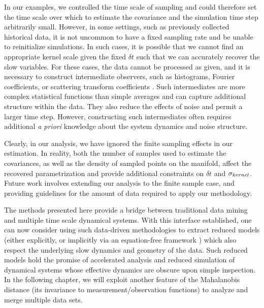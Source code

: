 In our examples, we controlled the time scale of sampling and could therefore set the time scale over which to estimate the covariance and the simulation time step arbitrarily small.
%
However, in some settings, such as previously collected historical data, it is not uncommon to have a fixed sampling rate and be unable to reinitialize simulations.
%
In such cases, it is possible that we cannot find an appropriate kernel scale given the fixed $\delta t$ such that we can accurately recover the slow variables.
%
For these cases, the data cannot be processed as given,
and it is necessary to construct intermediate observers,
such as histograms, Fourier coefficients, or scattering transform coefficients \cite{mallat2012group, talmon2014intrinsic, talmon2014manifold}.
%
Such intermediates are more complex statistical functions than simple averages and can capture additional structure within the data.
%
They also reduce the effects of noise and permit a larger time step.
%
However, constructing such intermediates often requires additional {\em a priori} knowledge about the system dynamics and noise structure.

Clearly, in our analysis, we have ignored the finite sampling effects in our estimation.
%
In reality, both the number of samples used to estimate the covariances, as well as the density of sampled points on the manifold, affect the recovered parametrization and provide additional constraints on $\delta t$ and $\sigma_{kernel}$.
%
Future work involves extending our analysis to the finite sample case, and providing guidelines for the amount of data required to apply our methodology.

The methods presented here provide a bridge between traditional data mining and multiple time scale dynamical systems.
%
With this interface established, one can now consider using such data-driven methodologies to extract reduced models (either explicitly, or implicitly via an equation-free framework \cite{erban2006gene, kevrekidis2004equation, kevrekidis2003equation,  kevrekidis2009equation}) which also respect the underlying slow dynamics and geometry of the data.
%
Such reduced models hold the promise of accelerated analysis and reduced simulation of dynamical systems whose effective dynamics are obscure upon simple inspection.
%
In the following chapter, we will exploit another feature of the Mahalanobis distance (its invariance to measurement/observation functions) to analyze and merge multiple data sets. 
